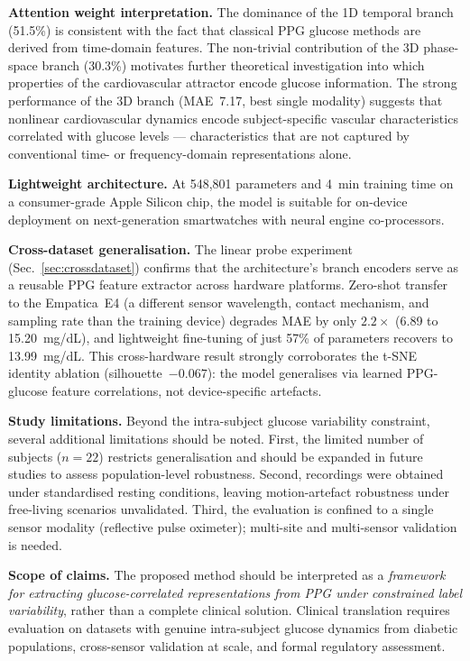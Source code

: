 \documentclass[conference]{IEEEtran}
\begin{document}
\textbf{Attention weight interpretation.}  The dominance of the 1D temporal
branch (51.5\%) is consistent with the fact that classical PPG glucose methods
are derived from time-domain features.  The non-trivial contribution of the 3D
phase-space branch (30.3\%) motivates further theoretical investigation into
which properties of the cardiovascular attractor encode glucose information.
The strong performance of the 3D branch (MAE~7.17, best single modality)
suggests that nonlinear cardiovascular dynamics encode subject-specific
vascular characteristics correlated with glucose levels --- characteristics
that are not captured by conventional time- or frequency-domain
representations alone.

\textbf{Lightweight architecture.}  At 548,801 parameters and 4~min training
time on a consumer-grade Apple Silicon chip, the model is suitable for
on-device deployment on next-generation smartwatches with neural engine
co-processors.

\textbf{Cross-dataset generalisation.}
The linear probe experiment (Sec.~\ref{sec:crossdataset}) confirms that
the architecture's branch encoders serve as a reusable PPG feature extractor
across hardware platforms.  Zero-shot transfer to the Empatica~E4 (a
different sensor wavelength, contact mechanism, and sampling rate than the
training device) degrades MAE by only $2.2\times$ (6.89 to 15.20~mg/dL),
and lightweight fine-tuning of just 57\% of parameters recovers to
13.99~mg/dL.  This cross-hardware result strongly corroborates the t-SNE
identity ablation (silhouette~$-0.067$): the model generalises via
learned PPG-glucose feature correlations, not device-specific artefacts.

\textbf{Study limitations.}
Beyond the intra-subject glucose variability constraint, several additional
limitations should be noted.
First, the limited number of subjects ($n=22$) restricts generalisation and
should be expanded in future studies to assess population-level robustness.
Second, recordings were obtained under standardised resting conditions,
leaving motion-artefact robustness under free-living scenarios unvalidated.
Third, the evaluation is confined to a single sensor modality (reflective
pulse oximeter); multi-site and multi-sensor validation is needed.

\textbf{Scope of claims.}
The proposed method should be interpreted as a \emph{framework for extracting
glucose-correlated representations from PPG under constrained label
variability}, rather than a complete clinical solution.
Clinical translation requires evaluation on datasets with genuine
intra-subject glucose dynamics from diabetic populations, cross-sensor
validation at scale, and formal regulatory assessment.
\end{document}
